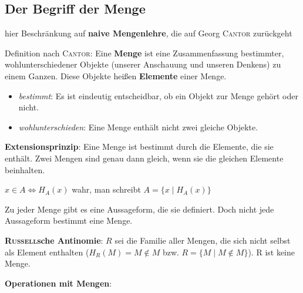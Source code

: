 \subsection {%
    Der Begriff der Menge%
}

hier Beschränkung auf \textbf{naive Mengenlehre}, die auf Georg \textsc{Cantor}
zurückgeht

Definition nach \textsc{Cantor}:
Eine \textbf{Menge} ist eine Zusammenfassung bestimmter, wohlunterschiedener
Objekte (unserer Anschauung und unseren Denkens) zu einem Ganzen.
Diese Objekte heißen \textbf{Elemente} einer Menge.

\begin{itemize}
    \item \emph{bestimmt}: Es ist eindeutig entscheidbar, ob ein Objekt zur
    Menge gehört oder nicht.

    \item \emph{wohlunterschieden}: Eine Menge enthält nicht zwei gleiche
    Objekte.
\end{itemize}

\textbf{Extensionsprinzip}: Eine Menge ist bestimmt durch die Elemente, die sie
enthält.
Zwei Mengen sind genau dann gleich, wenn sie die gleichen Elemente beinhalten.

$x \in A \Leftrightarrow H_{A}(x)$ wahr, man schreibt
$A = \{x \;|\; H_{A}(x)\}$

Zu jeder Menge gibt es eine Aussageform, die sie definiert.
Doch nicht jede Aussageform bestimmt eine Menge.

\textbf{\textsc{Russell}sche Antinomie}:
$R$ sei die Familie aller Mengen, die sich nicht selbst als Element enthalten
($H_{R}(M) = M \notin M$ bzw. $R = \{M \;|\; M \notin M\}$).
R ist keine Menge.

\textbf{Operationen mit Mengen}:

